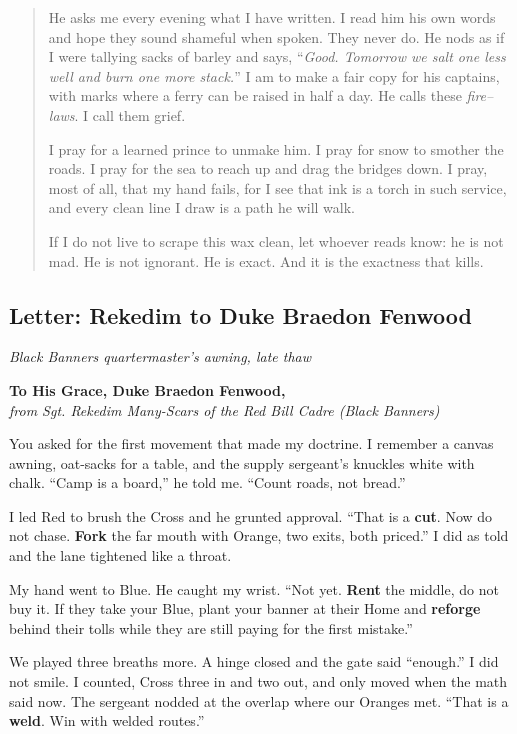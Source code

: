 \documentclass[11pt]{article}
\begin{document}
\begin{quote}
He asks me every evening what I have written. I read him his own words and hope they sound shameful when spoken. They never do. He nods as if I were tallying sacks of barley and says, “\emph{Good. Tomorrow we salt one less well and burn one more stack.}” I am to make a fair copy for his captains, with marks where a ferry can be raised in half a day. He calls these \emph{fire–laws}. I call them grief.

I pray for a learned prince to unmake him. I pray for snow to smother the roads. I pray for the sea to reach up and drag the bridges down. I pray, most of all, that my hand fails, for I see that ink is a torch in such service, and every clean line I draw is a path he will walk.

If I do not live to scrape this wax clean, let whoever reads know: he is not mad. He is not ignorant. He is exact. And it is the exactness that kills.
\end{quote}

\clearpage

\subsection{Letter: Rekedim to Duke Braedon Fenwood}

\noindent\textit{Black Banners quartermaster's awning, late thaw}

\medskip
\noindent\textbf{To His Grace, Duke Braedon Fenwood,}\\
\textit{from Sgt. Rekedim Many-Scars of the Red Bill Cadre (Black Banners)} 

\medskip
You asked for the first movement that made my doctrine. I remember a canvas awning, oat-sacks for a table, and the supply sergeant's knuckles white with chalk. ``Camp is a board,'' he told me. ``Count roads, not bread.''

I led Red to brush the Cross and he grunted approval. ``That is a \textbf{cut}. Now do not chase. \textbf{Fork} the far mouth with Orange, two exits, both priced.'' I did as told and the lane tightened like a throat.

My hand went to Blue. He caught my wrist. ``Not yet. \textbf{Rent} the middle, do not buy it. If they take your Blue, plant your banner at their Home and \textbf{reforge} behind their tolls while they are still paying for the first mistake.''

We played three breaths more. A hinge closed and the gate said ``enough.'' I did not smile. I counted, Cross three in and two out, and only moved when the math said now. The sergeant nodded at the overlap where our Oranges met. ``That is a \textbf{weld}. Win with welded routes.''
\end{document}

